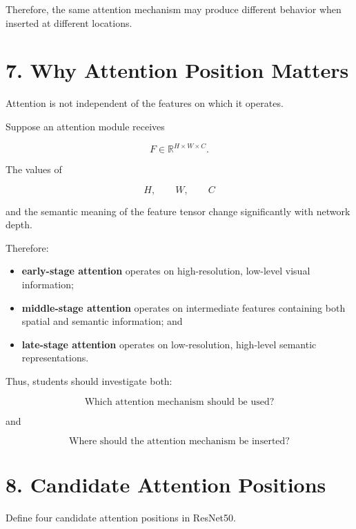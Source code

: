 \documentclass[10pt]{article}
\begin{document}
Therefore, the same attention mechanism may produce different behavior when
inserted at different locations.

\section*{7. Why Attention Position Matters}

Attention is not independent of the features on which it operates.

Suppose an attention module receives

\[
F\in\mathbb{R}^{H\times W\times C}.
\]

The values of

\[
H,\qquad W,\qquad C
\]

and the semantic meaning of the feature tensor change significantly with
network depth.

Therefore:

\begin{itemize}

\item \textbf{early-stage attention} operates on high-resolution,
low-level visual information;

\item \textbf{middle-stage attention} operates on intermediate features
containing both spatial and semantic information; and

\item \textbf{late-stage attention} operates on low-resolution,
high-level semantic representations.

\end{itemize}

Thus, students should investigate both:

\[
\boxed{\text{Which attention mechanism should be used?}}
\]

and

\[
\boxed{\text{Where should the attention mechanism be inserted?}}
\]

\section*{8. Candidate Attention Positions}

Define four candidate attention positions in ResNet50.
\end{document}
